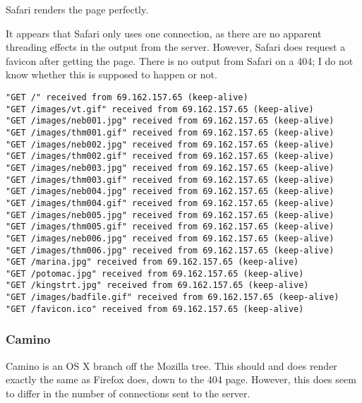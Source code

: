 \documentclass[11pt]{report}
\begin{document}
Safari renders the page perfectly.

It appears that Safari only uses one connection, as there are no apparent threading effects in the output from the server. However, Safari does request a favicon after getting the page. There is no output from Safari on a 404; I do not know whether this is supposed to happen or not.

\begin{verbatim}
"GET /" received from 69.162.157.65 (keep-alive)
"GET /images/vt.gif" received from 69.162.157.65 (keep-alive)
"GET /images/neb001.jpg" received from 69.162.157.65 (keep-alive)
"GET /images/thm001.gif" received from 69.162.157.65 (keep-alive)
"GET /images/neb002.jpg" received from 69.162.157.65 (keep-alive)
"GET /images/thm002.gif" received from 69.162.157.65 (keep-alive)
"GET /images/neb003.jpg" received from 69.162.157.65 (keep-alive)
"GET /images/thm003.gif" received from 69.162.157.65 (keep-alive)
"GET /images/neb004.jpg" received from 69.162.157.65 (keep-alive)
"GET /images/thm004.gif" received from 69.162.157.65 (keep-alive)
"GET /images/neb005.jpg" received from 69.162.157.65 (keep-alive)
"GET /images/thm005.gif" received from 69.162.157.65 (keep-alive)
"GET /images/neb006.jpg" received from 69.162.157.65 (keep-alive)
"GET /images/thm006.jpg" received from 69.162.157.65 (keep-alive)
"GET /marina.jpg" received from 69.162.157.65 (keep-alive)
"GET /potomac.jpg" received from 69.162.157.65 (keep-alive)
"GET /kingstrt.jpg" received from 69.162.157.65 (keep-alive)
"GET /images/badfile.gif" received from 69.162.157.65 (keep-alive)
"GET /favicon.ico" received from 69.162.157.65 (keep-alive)
\end{verbatim}

\subsubsection{Camino}

Camino is an OS X branch off the Mozilla tree. This should and does render exactly the same as Firefox does, down to the 404 page. However, this does seem to differ in the number of connections sent to the server.
\end{document}
